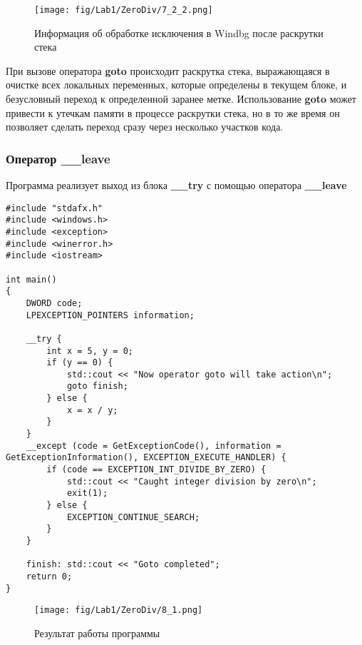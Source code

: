 \begin{figure}[H]
    \begin{center}
        \texttt{[image: fig/Lab1/ZeroDiv/7\_2\_2.png]}
        \caption{Информация об обработке исключения в Windbg после раскрутки стека}
        \label{pic:7_2_2}
    \end{center}
\end{figure}

При вызове оператора \textbf{goto} происходит раскрутка стека, выражающаяся в очистке всех локальных переменных, которые определены в текущем блоке, и безусловный переход к определенной заранее метке. Использование \textbf{goto} может привести к утечкам памяти в процессе раскрутки стека, но в то же время он позволяет сделать переход сразу через несколько участков кода.

\subsubsection{Оператор \_\_leave}
Программа реализует выход из блока \textbf{\_\_try} с помощью оператора \textbf{\_\_leave}

\begin{lstlisting}[caption=Выход из блока с помозью оператора \_\_leave]
#include "stdafx.h"
#include <windows.h>
#include <exception>
#include <winerror.h>
#include <iostream>

int main()
{
    DWORD code;
    LPEXCEPTION_POINTERS information;

    __try {
        int x = 5, y = 0;
        if (y == 0) {
            std::cout << "Now operator goto will take action\n";
            goto finish;
        } else {
            x = x / y;
        }
    }
    __except (code = GetExceptionCode(), information = GetExceptionInformation(), EXCEPTION_EXECUTE_HANDLER) {
        if (code == EXCEPTION_INT_DIVIDE_BY_ZERO) {
            std::cout << "Caught integer division by zero\n";
            exit(1);
        } else {
            EXCEPTION_CONTINUE_SEARCH;
        }
    }

    finish: std::cout << "Goto completed";
    return 0;
}
\end{lstlisting}

\begin{figure}[H]
    \begin{center}
        \texttt{[image: fig/Lab1/ZeroDiv/8\_1.png]}
        \caption{Результат работы программы}
        \label{pic:8_1}
    \end{center}
\end{figure}

